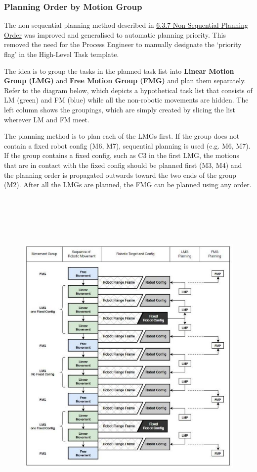 \documentclass[11pt]{book}
\begin{document}
\subsubsection{Planning Order by Motion Group}

The non-sequential planning method described in \uline{6.3.7 Non-Sequential Planning Order} was improved and generalised to automatic planning priority. This removed the need for the Process Engineer to manually designate the ‘priority flag’ in the High-Level Task template. 

The idea is to group the tasks in the planned task list into \textbf{Linear Motion Group (LMG)} and \textbf{Free Motion Group (FMG)} and plan them separately. Refer to the diagram below, which depicts a hypothetical task list that consists of LM (green) and FM (blue) while all the non-robotic movements are hidden. The left column shows the groupings, which are simply created by slicing the list wherever LM and FM meet. 

The planning method is to plan each of the LMGs first. If the group does not contain a fixed robot config (M6, M7), sequential planning is used (e.g. M6, M7). If the group contains a fixed config, such as C3 in the first LMG, the motions that are in contact with the fixed config should be planned first (M3, M4) and the planning order is propagated outwards toward the two ends of the group (M2). After all the LMGs are planned, the FMG can be planned using any order. 

\begin{figure}[H]
\includegraphics[width=15.92cm,height=17.04cm]{./images/image15.jpeg}
\end{figure}
\end{document}
